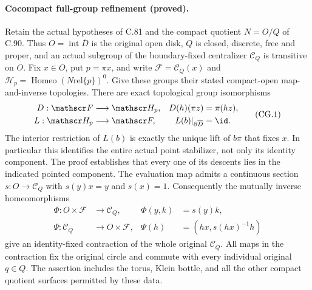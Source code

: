 
\paragraph{Cocompact full-group refinement (proved).}
Retain the actual hypotheses of C.81 and the compact quotient
$N=O/Q$ of C.90.  Thus $O=\operatorname{int}\overline D$ is
the original open disk, $Q$ is closed, discrete, free and proper,
and an actual subgroup of the boundary-fixed centralizer
$\mathscr C_Q$ is transitive on $O$.
Fix $x\in O$, put $p=\pi x$, and write
$\mathscr F=\mathscr C_Q(x)$ and
$\mathscr H_p=\operatorname{Homeo}(N\mathbin{\mathrm{rel}}\{p\})^0$.
Give these groups their stated compact-open map-and-inverse
topologies.  There are exact topological group isomorphisms
\[
 \begin{aligned}
 D:\mathscr F&\longrightarrow\mathscr H_p,
       &D(h)(\pi z)&=\pi(hz),\\
 L:\mathscr H_p&\longrightarrow\mathscr F,
       &L(b)|_{\partial\overline D}&=\id.
 \end{aligned}                                                    \tag{CG.1}
\]
The interior restriction of $L(b)$ is exactly the unique
lift of $b\pi$ that fixes $x$.
In particular this identifies the entire actual point stabilizer,
not only its identity component.  The proof establishes that every
one of its descents lies in the indicated pointed component.
The evaluation map admits a continuous section
$s:O\to\mathscr C_Q$ with $s(y)x=y$ and $s(x)=1$.
Consequently the mutually inverse homeomorphisms
\[
 \begin{aligned}
 \Phi:O\times\mathscr F&\longrightarrow\mathscr C_Q,
       &\Phi(y,k)&=s(y)k,\\
 \Psi:\mathscr C_Q&\longrightarrow O\times\mathscr F,
       &\Psi(h)&=(hx,s(hx)^{-1}h)
 \end{aligned}                                                    \tag{CG.2}
\]
give an identity-fixed contraction of the whole original
$\mathscr C_Q$.  All maps in the contraction fix the original
circle and commute with every individual original $q\in Q$.
The assertion includes the torus, Klein bottle, and all the
other compact quotient surfaces permitted by these data.


